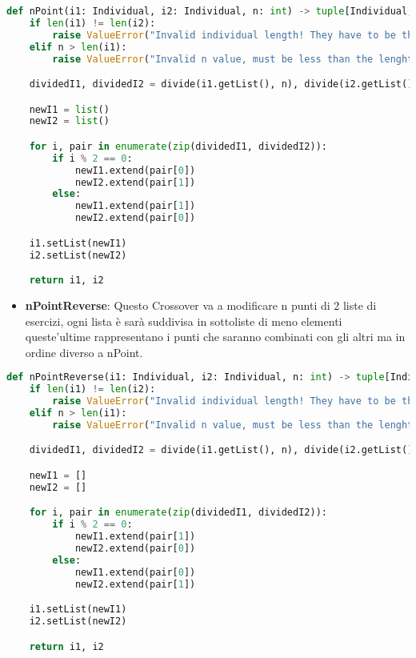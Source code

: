 \documentclass{article}
\begin{document}
\begin{lstlisting}[language=Python, breaklines, no caption]
def nPoint(i1: Individual, i2: Individual, n: int) -> tuple[Individual, Individual]:
    if len(i1) != len(i2):
        raise ValueError("Invalid individual length! They have to be the same.")
    elif n > len(i1):
        raise ValueError("Invalid n value, must be less than the lenght of the individual!")

    dividedI1, dividedI2 = divide(i1.getList(), n), divide(i2.getList(), n)

    newI1 = list()
    newI2 = list()

    for i, pair in enumerate(zip(dividedI1, dividedI2)):
        if i % 2 == 0:
            newI1.extend(pair[0])
            newI2.extend(pair[1])
        else:
            newI1.extend(pair[1])
            newI2.extend(pair[0])

    i1.setList(newI1)
    i2.setList(newI2)

    return i1, i2
        \end{lstlisting}

\begin{itemize}
\item\textbf{nPointReverse}: Questo Crossover va a modificare n punti di 2 liste di esercizi, ogni lista è sarà suddivisa in sottoliste di meno elementi queste'ultime rappresentano i punti che saranno combinati con gli altri ma in ordine diverso a nPoint.
\end{itemize}

\begin{lstlisting}[language=Python, breaklines, no caption]
def nPointReverse(i1: Individual, i2: Individual, n: int) -> tuple[Individual, Individual]:
    if len(i1) != len(i2):
        raise ValueError("Invalid individual length! They have to be the same.")
    elif n > len(i1):
        raise ValueError("Invalid n value, must be less than the lenght of the individual!")

    dividedI1, dividedI2 = divide(i1.getList(), n), divide(i2.getList(), n)

    newI1 = []
    newI2 = []

    for i, pair in enumerate(zip(dividedI1, dividedI2)):
        if i % 2 == 0:
            newI1.extend(pair[1])
            newI2.extend(pair[0])
        else:
            newI1.extend(pair[0])
            newI2.extend(pair[1])

    i1.setList(newI1)
    i2.setList(newI2)

    return i1, i2
\end{lstlisting}
\end{document}
